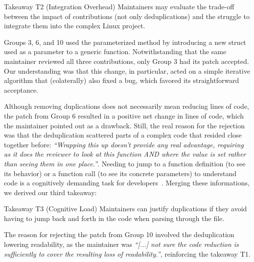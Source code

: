 \documentclass[10pt,conference]{IEEEtran}
\newenvironment{highlight-box}[1]{%
  \begin{tcolorbox}[colback=gray!10, colframe=gray!50!black, boxrule=0.5pt,
                    left=1mm, right=1mm, top=1mm, bottom=1mm, sharp corners]
  \textbf{#1:} \itshape}{\end{tcolorbox}}
\begin{document}
\begin{highlight-box}{Takeaway T2 (Integration Overhead)}
Maintainers may evaluate the trade-off between the impact of contributions
(not only deduplications) and the struggle to integrate them into the complex
Linux project.
\end{highlight-box}

Groups 3, 6, and 10 used the parameterized method by introducing a new struct used as a parameter to a generic function. Notwithstanding that the same maintainer reviewed all three contributions, only Group 3 had its patch accepted. Our understanding was that this change, in particular, acted on a simple iterative algorithm that (colaterally) also fixed a bug, which favored its straightforward acceptance.

Although removing duplications does not necessarily mean reducing lines of code, the patch from Group 6 resulted in a positive net change in lines of code, which the maintainer pointed out as a drawback. Still, the real reason for the rejection was that the deduplication scattered parts of a complex code that resided close together before: \textit{``Wrapping this up doesn't provide any real advantage, requiring as it does the reviewer to look at this function AND where the value is set rather than seeing them in one place.''}. Needing to jump to a function definition (to see its behavior) or a function call (to see its concrete parameters) to understand code is a cognitively demanding task for developers~\cite{questions-programmers-ask}. Merging these informations, we derived our third takeaway:

\begin{highlight-box}{Takeaway T3 (Cognitive Load)}
Maintainers can justify duplications if they avoid having to jump back and forth in the code when parsing through the file.
\end{highlight-box}

The reason for rejecting the patch from Group 10 involved the deduplication lowering readability, as the maintainer was \textit{``[...] not sure the code reduction is sufficiently to cover the resulting loss of readability.''}, reinforcing the takeaway T1.
\end{document}
